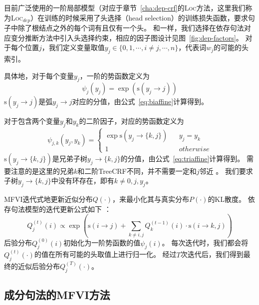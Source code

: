 目前广泛使用的一阶局部模型（对应于章节~\ref{cha:dep-crf}的\textsc{Loc}方法，这里我们称为\textsc{Loc}$_{dep}$）在训练的时候采用了头选择（head selection）的训练损失函数，要求句子中除了根结点之外的每个词有且仅有一个头。
和\citet{wang-tu-2020-second}一样，我们选择在依存句法对应变分推断方法中引入头选择约束，相应的因子图设计见图~\ref{fig:dep-factors}。
对于每个位置$j$，我们定义变量取值$y_j\in \{0,1,\cdots,i\neq j,\cdots,n\}$，代表词$w_j$的可能的头索引。

具体地，对于每个变量$y_j$，一阶的势函数定义为
\begin{equation}
	\label{eq:dep-1o-potential}
	\psi_j(y_j)=\exp(\mathrm{s}(y_j\rightarrow j))
\end{equation}
$\mathrm{s}(y_j\rightarrow j)$是弧$y_j\rightarrow j$对应的分值，由公式~\ref{eq:biaffine}计算得到。

对于包含两个变量$y_{j}$和$y_{k}$的二阶因子，对应的势函数定义为
\begin{equation}
	\label{eq:2o-dep-potential}
	\psi_{j,k}(y_j,y_k)=\left\{
	\begin{array}{rcl}
		\exp \mathrm{s}(y_j\rightarrow \{k,j\}) &   & {y_j=y_k}   \\
		1                                       &   & {otherwise} 
	\end{array}
	\right.
\end{equation}
$\mathrm{s}(y_j\rightarrow \{k,j\})$是兄弟子树$y_j\rightarrow \{k,j\}$的分值，由公式~\ref{eq:triaffine}计算得到。
需要注意的是这里的兄弟$k$和二阶TreeCRF不同，并不需要一定和$j$邻近 \citep{smith-eisner-2008-dependency}。
我们要求子树$y_j\rightarrow \{k,j\}$中没有环存在，即有$k\neq {0,j,y_j}$。

MFVI迭代式地更新近似分布$Q(\cdot)$，来最小化其与真实分布$P(\cdot)$的KL散度。
依存句法模型的迭代更新公式如下 \citep{wang-tu-2020-second}：
\begin{equation}
	\label{eq:mfvi-dep}
	Q_{j}^{(t)}(i)\propto \exp\left(\mathrm{s}(i\rightarrow j) +\sum_{k\neq i,j} Q_{k}^{(t-1)}(i)\cdot \mathrm{s}(i\rightarrow {k,j}) \right)
\end{equation}
后验分布$Q_j^{(0)}(i)$初始化为一阶势函数的值$\psi_j(i)$。
每次迭代时，我们都会将$Q_j^{(t)}(\cdot)$的值在所有可能的头取值上进行归一化。
经过$T$次迭代后，我们得到最终的近似后验分布$Q_j^{(T)}(\cdot)$。

\subsection{成分句法的MFVI方法}\label{sec:con-vi}

